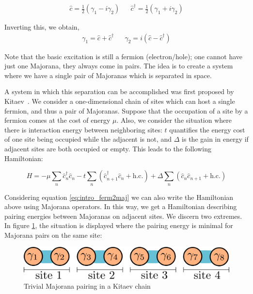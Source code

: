 	\begin{align}
		\hat{c} =  \frac{1}{2} \left( \gamma_1 - i\gamma_2 \right) && \hat{c}^\dagger = \frac{1}{2} \left( \gamma_1 + i\gamma_2 \right)
		\label{eq:intro_ferm2maj}
	\end{align}

	Inverting this, we obtain,
	\begin{align}
		\gamma_1 = \hat{c} + \hat{c}^\dagger && \gamma_2 = i \left( \hat{c} - \hat{c}^\dagger \right)
		\label{eq:intro_maj2ferm}
	\end{align}

	Note that the basic excitation is still a fermion (electron/hole); one cannot have just one Majorana, they always come in pairs.
	The idea is to create a system where we have a single pair of Majoranas which is separated in space.

	A system in which this separation can be accomplished was first proposed by Kitaev~\cite{kitaev_unpaired_2001}.
	We consider a one-dimensional chain of sites which can host a single fermion, and thus a pair of Majoranas.
	Suppose that the occupation of a site by a fermion comes at the cost of energy $\mu$.
	Also, we consider the situation where there is interaction energy between neighboring sites: $t$ quantifies the energy cost of one site being occupied while the adjacent is not, and $\Delta$ is the gain in energy if adjacent sites are both occupied or empty.
	This leads to the following Hamiltonian:

	\begin{equation}
		H = -\mu \sum_n \hat{c}_n^\dagger \hat{c}_n
		- t \sum_n \left( \hat{c}_{n+1}^\dagger \hat{c}_n +\text{h.c.} \right) 
		+ \Delta \sum_n \left( \hat{c}_n \hat{c}_{n+1} +\text{h.c.} \right) 
	\end{equation}

	Considering equation \eqref{eq:intro_ferm2maj} we can also write the Hamiltonian above using Majorana operators.
	In this way, we get a Hamiltonian describing pairing energies between Majoranas on adjacent sites.
	We discern two extremes.
	In figure \ref{fig:trivial_majoranas}, the situation is displayed where the pairing energy is minimal for Majorana pairs on the same site:
	\begin{figure}[htb!]
	\centering
	\includegraphics[width=0.95\columnwidth]{images/majorana_trivial_pairing}
	\caption{Trivial Majorana pairing in a Kitaev chain}
	\label{fig:trivial_majoranas}
	\end{figure}

